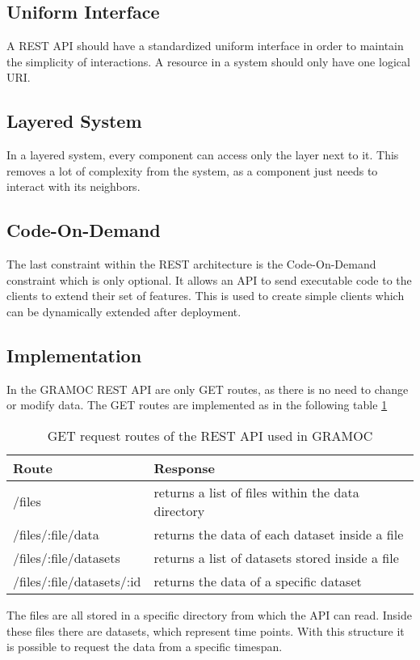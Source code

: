 \subsection{Uniform Interface}
A REST API should have a standardized uniform interface in order to maintain the simplicity of interactions. A resource in a system should only have one logical URI.


\subsection{Layered System}
In a layered system, every component can access only the layer next to it. This removes a lot of complexity from the system, as a component just needs to interact with its neighbors.

\subsection{Code-On-Demand}
The last constraint within the REST architecture is the Code-On-Demand constraint which is only optional. It allows an API to send executable code to the clients to extend their set of features. This is used to create simple clients which can be dynamically extended after deployment.

\subsection{Implementation}
In the GRAMOC REST API are only GET routes, as there is no need to change or modify data. The GET routes are implemented as in the following table \ref{tab:get_routes}

\begin{table}[H]
    \centering
    \begin{tabular}{| l | l |}
    \hline
    \textbf{Route} & \textbf{Response} \\ \hline
    /files & returns a list of files within the data directory \\ \hline
    /files/:file/data & returns the data of each dataset inside a file \\ \hline
    /files/:file/datasets & returns a list of datasets stored inside a file \\ \hline
    /files/:file/datasets/:id & returns the data of a specific dataset \\
    \hline
    \end{tabular}
    \caption{GET request routes of the REST API used in GRAMOC}
    \label{tab:get_routes}
\end{table}

The files are all stored in a specific directory from which the API can read. Inside these files there are datasets, which represent time points. With this structure it is possible to request the data from a specific timespan.
